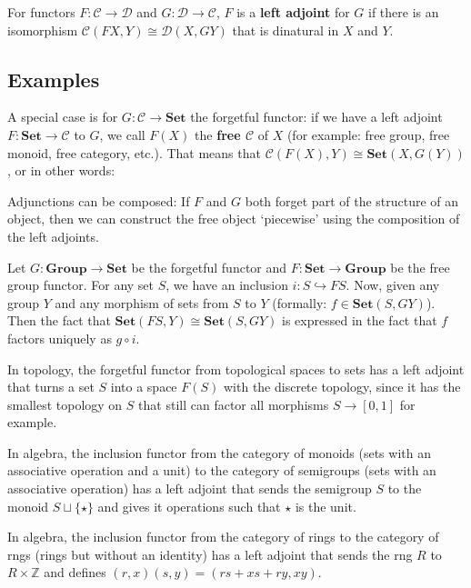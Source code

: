 \documentclass{amsbook}
\newcommand{\Catc}[1]{\mathcal{#1}}
\newcommand{\CC}{\Catc{C}}
\newcommand{\DD}{\Catc{D}}
\newcommand{\Catb}[1]{\mathbf{#1}}
\newcommand{\SET}{\Catb{Set}}
\newcommand{\Hom}[3]{{#1}\left(#2,#3\right)}
\theoremstyle{definition}
\begin{document}
  For functors $ F: \CC \to \DD $ and $ G: \DD \to \CC $, $ F $ is a \textbf{left adjoint} for $ G $ if there is an isomorphism $ \Hom \CC {F X} Y \cong \Hom \DD X {G Y} $ that is dinatural in $ X $ and $ Y $.

  \subsection{Examples}
  A special case is for $ G: \CC \to \SET $ the forgetful functor: if we have a left adjoint $ F: \SET \to \CC $ to $ G $, we call $ F(X) $ the \textbf{free $ \CC $} of $ X $ (for example: free group, free monoid, free category, etc.). That means that $ \Hom \CC {F(X)} Y \cong \Hom \SET X {G(Y)} $, or in other words:

  Adjunctions can be composed: If $ F $ and $ G $ both forget part of the structure of an object, then we can construct the free object `piecewise' using the composition of the left adjoints.

  Let $ G: \Catb{Group} \to \SET $ be the forgetful functor and $ F: \SET \to \Catb{Group} $ be the free group functor. For any set $ S $, we have an inclusion $ i: S \hookrightarrow F S $. Now, given any group $ Y $ and any morphism of sets from $ S $ to $ Y $ (formally: $ f \in \Hom \SET S {G Y} $). Then the fact that $ \Hom \SET {FS} Y \cong \Hom \SET S {G Y} $ is expressed in the fact that $ f $ factors uniquely as $ g \circ i $.
  \begin{center}
  \end{center}

  In topology, the forgetful functor from topological spaces to sets has a left adjoint that turns a set $ S $ into a space $ F(S) $ with the discrete topology, since it has the smallest topology on $ S $ that still can factor all morphisms $ S \to [0, 1] $ for example.

  In algebra, the inclusion functor from the category of monoids (sets with an associative operation and a unit) to the category of semigroups (sets with an associative operation) has a left adjoint that sends the semigroup $ S $ to the monoid $ S \sqcup \{ \star \} $ and gives it operations such that $ \star $ is the unit.

  In algebra, the inclusion functor from the category of rings to the category of rngs (rings but without an identity) has a left adjoint that sends the rng $ R $ to $ R \times \mathbb Z $ and defines $ (r, x) (s, y) = (rs + xs + ry, xy) $.
\end{document}
